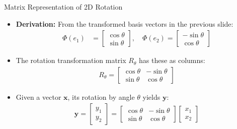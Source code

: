 \begin{frame}{Matrix Representation of 2D Rotation}
    \begin{itemize}
        \item \textbf{Derivation:} From the transformed basis vectors in the previous slide:
        \begin{align}
            \Phi(e_1) &= \begin{bmatrix} \cos \theta \\ \sin \theta \end{bmatrix}, \quad
            \Phi(e_2) = \begin{bmatrix} -\sin \theta \\ \cos \theta \end{bmatrix}
        \end{align}
        
        \item The rotation transformation matrix $R_\theta$ has these as columns:
        \begin{align}
            R_\theta = \begin{bmatrix}
                \cos \theta & -\sin \theta \\
                \sin \theta & \cos \theta
            \end{bmatrix}
        \end{align}
    \end{itemize}
\end{frame}
\begin{frame}
    \begin{itemize}
        \item Given a vector $\mathbf{x}$, its rotation by angle $\theta$ yields $\mathbf{y}$:
        \begin{align}
            \mathbf{y} = \begin{bmatrix}
                y_1 \\
                y_2
            \end{bmatrix} = \begin{bmatrix}
                \cos \theta & -\sin \theta \\
                \sin \theta & \cos \theta
            \end{bmatrix} \begin{bmatrix}
                x_1 \\
                x_2
            \end{bmatrix}
        \end{align}
    \end{itemize}
\end{frame}

